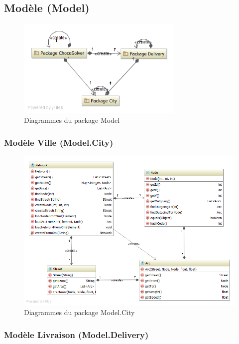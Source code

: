 \subsection{Mod\`ele (Model)}

\begin{figure}[h]
    \centering
    \includegraphics[width=80mm]{../diagrams/classes_packages/classes_packages/model/package_model.png}
    \caption{Diagrammes du package Model}
    \label{diagram:uml_model}
\end{figure}
\pagebreak

\subsubsection{Mod\`ele Ville (Model.City)}

\begin{figure}[h]
    \centering
    \includegraphics[width=160mm]{../diagrams/classes_packages/classes_packages/model/city.png}
    \caption{Diagrammes du package Model.City}
    \label{diagram:uml_model_city}
\end{figure}
\pagebreak

\subsubsection{Mod\`ele Livraison (Model.Delivery)}

